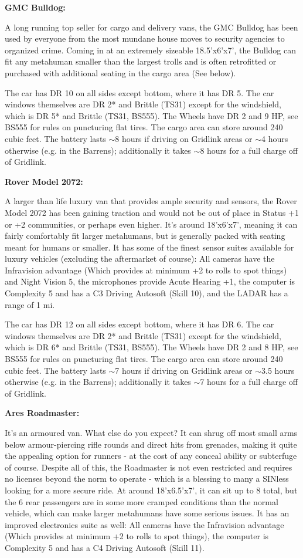\textbf{GMC Bulldog:}

A long running top seller for cargo and delivery vans, the GMC Bulldog has been used by everyone from the most mundane house moves to security agencies to organized crime. Coming in at an extremely sizeable 18.5'x6'x7', the Bulldog can fit any metahuman smaller than the largest trolls and is often retrofitted or purchased with additional seating in the cargo area (See below).

The car has DR 10 on all sides except bottom, where it has DR 5. The car windows themselves are DR 2* and Brittle (TS31) except for the windshield, which is DR 5* and Brittle (TS31, BS555). The Wheels have DR 2 and 9 HP, see BS555 for rules on puncturing flat tires. The cargo area can store around 240 cubic feet. The battery lasts $\sim$8 hours if driving on Gridlink areas or $\sim$4 hours otherwise (e.g. in the Barrens); additionally it takes $\sim$8 hours for a full charge off of Gridlink.

\textbf{Rover Model 2072:}

A larger than life luxury van that provides ample security and sensors, the Rover Model 2072 has been gaining traction and would not be out of place in Status +1 or +2 communities, or perhaps even higher. It's around 18'x6'x7', meaning it can fairly comfortably fit larger metahumans, but is generally packed with seating meant for humans or smaller. It has some of the finest sensor suites available for luxury vehicles (excluding the aftermarket of course): All cameras have the Infravision advantage (Which provides at minimum +2 to rolls to spot things) and Night Vision 5, the microphones provide Acute Hearing +1, the computer is Complexity 5 and has a C3 Driving Autosoft (Skill 10), and the LADAR has a range of 1 mi.

The car has DR 12 on all sides except bottom, where it has DR 6. The car windows themselves are DR 2* and Brittle (TS31) except for the windshield, which is DR 6* and Brittle (TS31, BS555). The Wheels have DR 2 and 8 HP, see BS555 for rules on puncturing flat tires. The cargo area can store around 240 cubic feet. The battery lasts $\sim$7 hours if driving on Gridlink areas or $\sim$3.5 hours otherwise (e.g. in the Barrens); additionally it takes $\sim$7 hours for a full charge off of Gridlink.

\textbf{Ares Roadmaster:}

It's an armoured van. What else do you expect? It can shrug off most small arms below armour-piercing rifle rounds and direct hits from grenades, making it quite the appealing option for runners - at the cost of any conceal ability or subterfuge of course. Despite all of this, the Roadmaster is not even restricted and requires no licenses beyond the norm to operate - which is a blessing to many a SINless looking for a more secure ride. At around 18'x6.5'x7', it can sit up to 8 total, but the 6 rear passengers are in some more cramped conditions than the normal vehicle, which can make larger metahumans have some serious issues. It has an improved electronics suite as well: All cameras have the Infravision advantage (Which provides at minimum +2 to rolls to spot things), the computer is Complexity 5 and has a C4 Driving Autosoft (Skill 11).

